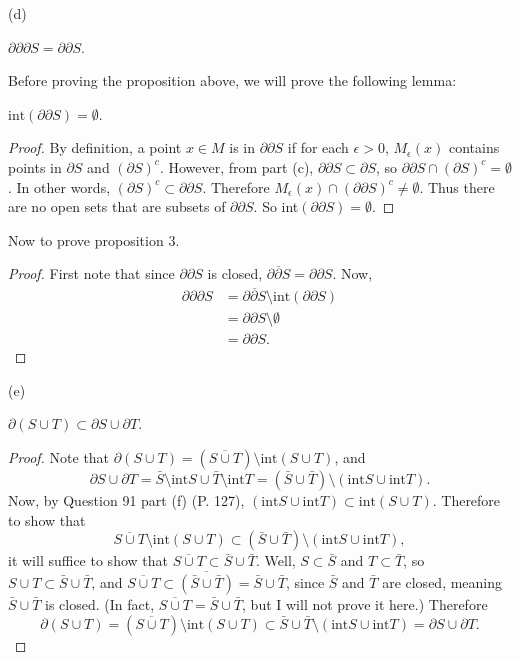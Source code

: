 \documentclass[11pt]{article}
\begin{document}
(d) 
\begin{Proposition}
$\partial \partial \partial S = \partial \partial S$.
\end{Proposition}
Before proving the proposition above, we will prove the following lemma:

\begin{Lemma} $\text{int}(\partial\partial S) = \emptyset$.
\end{Lemma}

\begin{proof}
  By definition, a point $x\in M$ is in $\partial \partial S$ if for each $\epsilon > 0$, $M_{\epsilon}(x)$ contains points in $\partial S$ and $(\partial S)^{c}$. 
  However, from part (c), $\partial \partial S \subset \partial S$, so $\partial\partial S \cap (\partial S)^{c} = \emptyset$. In other words,
  $(\partial S)^{c} \subset \partial \partial S$.
  Therefore $M_{\epsilon}(x) \cap (\partial \partial S)^{c} \neq \emptyset$. Thus there are no open sets 
  that are subsets of $\partial \partial S$. So int$(\partial\partial S) = \emptyset$.
\end{proof}

Now to prove proposition 3.

\begin{proof}
  First note that since $\partial \partial S$ is closed, $\overline{\partial \partial S} = \partial\partial S$. Now,  
  \begin{align*}
    \partial \partial \partial S & = \overline{\partial \partial S} \setminus\text{int}(\partial\partial S) \\
    & = \partial \partial S \setminus \emptyset \\
    & = \partial \partial S.
  \end{align*}
\end{proof}

(e) \begin{Proposition}
  $\partial(S\cup T) \subset \partial S \cup \partial T$.
\end{Proposition}

\begin{proof}
  Note that $\partial(S\cup T) = (\overline{S\cup T}) \setminus \text{int}(S\cup T)$, and 
  \[ \partial S \cup \partial T = \bar{S} \setminus \text{int}S \cup \bar{T}\setminus \text{int}T = (\bar{S} \cup \bar{T}) \setminus (\text{int}S\cup\text{int}T).\]
  Now, by Question 91 part (f) (P. 127), $(\text{int}S\cup\text{int}T) \subset \text{int}(S\cup T)$.
  Therefore to show that 
  \[ \overline{S\cup T} \setminus \text{int}(S\cup T) \subset (\bar{S} \cup \bar{T}) \setminus (\text{int}S \cup \text{int}T),\]
  it will suffice to show that $\overline{S\cup T} \subset \bar{S}\cup \bar{T}$.
  Well, $S\subset \bar{S}$ and $T\subset \bar{T}$, so $S\cup T \subset \bar{S}\cup\bar{T}$, and $\overline{S\cup T} \subset \overline{(\bar{S}\cup\bar{T})} = \bar{S}\cup \bar{T}$,
  since $\bar{S}$ and $\bar{T}$ are closed, meaning $\bar{S}\cup \bar{T}$ is closed. (In fact,
  $\overline{S\cup T} = \bar{S}\cup \bar{T}$, but I will not prove it here.)
  Therefore 
  \[ \partial (S\cup T) = (\overline{S\cup T})\setminus \text{int}(S\cup T) \subset \bar{S}\cup \bar{T}\setminus (\text{int}S\cup\text{int}T) = \partial S\cup\partial T.\]
\end{proof}
\end{document}
